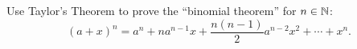 \begin{problem}
  Use Taylor's Theorem to prove the ``binomial theorem'' for $n \in \mathbb{N}$:
  \[ (a + x)^n = a^n + na^{n-1}x + \frac{n(n-1)}{2}a^{n-2}x^2 + \cdots + x^n. \]
\end{problem}

\begin{answer}
  
\end{answer}

